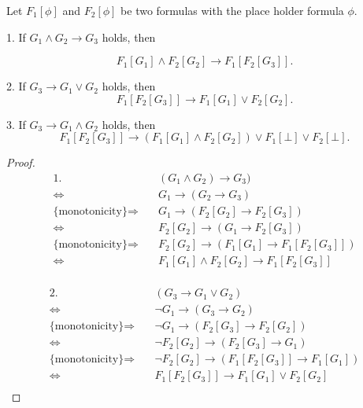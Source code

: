 \documentclass{llncs}
\begin{document}
\begin{lemma}
  Let $F_1[\phi]$ and $F_2[\phi]$ be two formulas with the place holder
  formula $\phi$.  
  
  1. If $G_1\land G_2\rightarrow G_3$ holds, then

  \[ F_1[G_1] \land F_2[G_2] \rightarrow F_1[F_2[G_3]]. \]

  2. If $G_3 \rightarrow G_1\lor G_2$ holds, then
  \[ F_1[F_2[G_3]] \rightarrow F_1[G_1] \lor F_2[G_2]. \]

  3. If $G_3 \rightarrow G_1\land G_2$ holds, then
  \[ F_1[F_2[G_3]] \rightarrow (F_1[G_1] \land F_2[G_2]) \lor F_1[\bot] \lor F_2[\bot]. \]  
\end{lemma}
\begin{proof}
  \begin{align*}
  1.\qquad &\quad
    (G_1 \land G_2) \rightarrow G_3)\\
    \Leftrightarrow&\quad
    G_1 \rightarrow (G_2 \rightarrow G_3)\\
    \text{\{monotonicity\}}\Rightarrow&\quad 
    G_1 \rightarrow (F_2[G_2] \rightarrow F_2[G_3])\\
    \Leftrightarrow&\quad
    F_2[G_2] \rightarrow (G_1 \rightarrow F_2[G_3])\\
    \text{\{monotonicity\}}\Rightarrow&\quad 
    F_2[G_2] \rightarrow (F_1[G_1] \rightarrow F_1[F_2[G_3]])\\
    \Leftrightarrow&\quad
    F_1[G_1] \land F_2[G_2] \rightarrow F_1[F_2[G_3]]\\
  \end{align*}

  \begin{align*}
    2.\qquad &\quad
    (G_3 \rightarrow G_1\lor G_2)\\
    \Leftrightarrow&\quad
    \lnot G_1 \rightarrow (G_3 \rightarrow G_2)\\
    \text{\{monotonicity\}}\Rightarrow&\quad 
    \lnot G_1 \rightarrow (F_2[G_3] \rightarrow F_2[G_2])\\
    \Leftrightarrow&\quad
    \lnot F_2[G_2] \rightarrow (F_2[G_3] \rightarrow G_1)\\
    \text{\{monotonicity\}}\Rightarrow&\quad 
    \lnot F_2[G_2] \rightarrow (F_1[F_2[G_3]] \rightarrow F_1[G_1])\\
    \Leftrightarrow&\quad
    F_1[F_2[G_3]] \rightarrow F_1[G_1] \lor F_2[G_2] \\
  \end{align*}


\end{proof}
\end{document}
